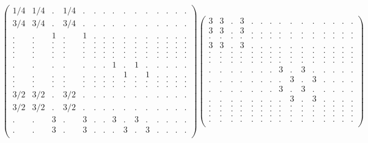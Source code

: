 \documentclass[12pt,a4paper]{amsart}
\begin{document}
\begin{align*}
\left(\begin{array}{rrrrrrrrrrrrrrr}%
1/4&1/4&.&1/4&.&.&.&.&.&.&.&.&.&.&.\\%
3/4&3/4&.&3/4&.&.&.&.&.&.&.&.&.&.&.\\%
.&.&1&.&1&.&.&.&.&.&.&.&.&.&.\\%
.&.&.&.&.&.&.&.&.&.&.&.&.&.&.\\%
.&.&.&.&.&.&.&.&.&.&.&.&.&.&.\\%
.&.&.&.&.&.&.&.&.&.&.&.&.&.&.\\%
.&.&.&.&.&.&.&.&.&.&.&.&.&.&.\\%
.&.&.&.&.&.&.&1&.&1&.&.&.&.&.\\%
.&.&.&.&.&.&.&.&1&.&1&.&.&.&.\\%
.&.&.&.&.&.&.&.&.&.&.&.&.&.&.\\%
.&.&.&.&.&.&.&.&.&.&.&.&.&.&.\\%
3/2&3/2&.&3/2&.&.&.&.&.&.&.&.&.&.&.\\%
3/2&3/2&.&3/2&.&.&.&.&.&.&.&.&.&.&.\\%
.&.&3&.&3&.&.&3&.&3&.&.&.&.&.\\%
.&.&3&.&3&.&.&.&3&.&3&.&.&.&.\\%
\end{array}\right)%
\left(\begin{array}{rrrrrrrrrrrrrrr}%
3&3&.&3&.&.&.&.&.&.&.&.&.&.&.\\%
3&3&.&3&.&.&.&.&.&.&.&.&.&.&.\\%
.&.&.&.&.&.&.&.&.&.&.&.&.&.&.\\%
3&3&.&3&.&.&.&.&.&.&.&.&.&.&.\\%
.&.&.&.&.&.&.&.&.&.&.&.&.&.&.\\%
.&.&.&.&.&.&.&.&.&.&.&.&.&.&.\\%
.&.&.&.&.&.&.&.&.&.&.&.&.&.&.\\%
.&.&.&.&.&.&.&3&.&3&.&.&.&.&.\\%
.&.&.&.&.&.&.&.&3&.&3&.&.&.&.\\%
.&.&.&.&.&.&.&3&.&3&.&.&.&.&.\\%
.&.&.&.&.&.&.&.&3&.&3&.&.&.&.\\%
.&.&.&.&.&.&.&.&.&.&.&.&.&.&.\\%
.&.&.&.&.&.&.&.&.&.&.&.&.&.&.\\%
.&.&.&.&.&.&.&.&.&.&.&.&.&.&.\\%
.&.&.&.&.&.&.&.&.&.&.&.&.&.&.\\%
\end{array}\right)%
\end{align*}
\end{document}
